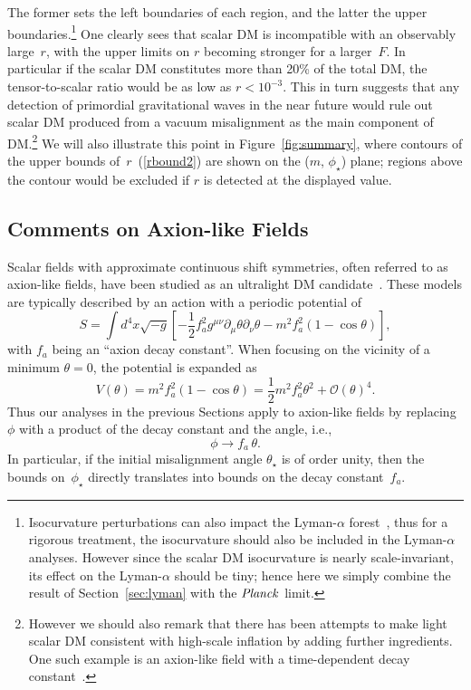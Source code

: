\documentclass[11pt,nofootinbib]{article}
\numberwithin{equation}{section}
\begin{document}
The former sets the left boundaries of each region, and the latter the
upper boundaries.\footnote{Isocurvature perturbations can
also impact the Lyman-$\alpha$ 
forest~\cite{Beltran:2005gr}, thus for a rigorous treatment,
the isocurvature should also be included in the Lyman-$\alpha$ analyses. 
However since the scalar DM isocurvature is nearly scale-invariant, 
its effect on the Lyman-$\alpha$ should be tiny;
hence here we simply combine the result of Section~\ref{sec:lyman}
with the ${\it Planck}$ limit.}
One clearly sees that scalar DM is incompatible with an observably
large~$r$,
with the upper limits on $r$ becoming stronger for a larger~$F$.
In particular if the scalar DM constitutes more than 20\% of the total
DM, the tensor-to-scalar ratio would be as low as $r < 10^{-3}$.
This in turn suggests that any detection of primordial gravitational
waves in the near future would rule out scalar DM produced from a vacuum
misalignment as the main component of DM.\footnote{However we should also
remark that there has been attempts to make light scalar DM consistent
with high-scale inflation by adding further ingredients.
One such example is an axion-like field with a time-dependent decay
constant~\cite{Linde:1990yj,Linde:1991km,Higaki:2014ooa,Chun:2014xva,Fairbairn:2014zta,Kobayashi:2016qld}.} 
We will also illustrate this point in Figure~\ref{fig:summary}, where 
contours of the upper bounds of~$r$~(\ref{rbound2}) are shown 
on the ($m$, $\phi_\star$) plane;
regions above the contour would be excluded if $r$ is detected at the
displayed value.


\subsection{Comments on Axion-like Fields}
\label{subsec:axion}

Scalar fields with approximate continuous shift symmetries, 
often referred to as axion-like fields, have been studied as an
ultralight DM candidate~\cite{Arvanitaki:2009fg,Ringwald:2012hr,Hui:2016ltb}.
These models are typically described by an action with a periodic
potential of
\begin{equation}
 S = \int d^4 x \sqrt{-g}
  \left[
   -\frac{1}{2} f_a^2  g^{\mu \nu} \partial_\mu \theta \partial_\nu \theta
 - m^2 f_a^2 \left( 1 - \cos \theta  \right)
  \right],
\end{equation}
with $f_a$ being an ``axion decay constant''.
When focusing on the vicinity of a minimum $\theta = 0$,
the potential is expanded as 
\begin{equation}
 V(\theta) = m^2 f_a^2 \left( 1 - \cos \theta  \right) =
  \frac{1}{2} m^2 f_a^2 \theta^2 + \mathcal{O} (\theta)^4.
\label{cosine-pot}
\end{equation}
Thus our analyses in the previous Sections apply to
axion-like fields by replacing~$\phi$ with a product of the decay
constant and the angle, i.e.,
\begin{equation}
 \phi \to f_a \, \theta.
\end{equation}
In particular, if the initial misalignment angle $\theta_\star$ is of
order unity, then the bounds on~$\phi_\star$ directly translates into
bounds on the decay constant~$f_a$. 
\end{document}

